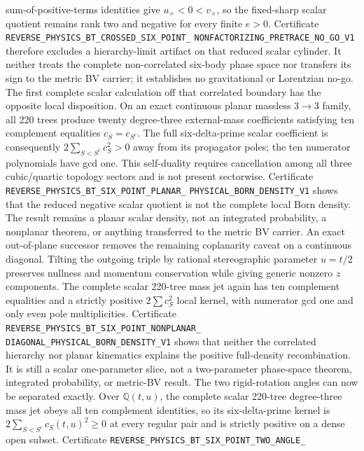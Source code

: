 \documentclass[11pt]{article}
\theoremstyle{definition}
\theoremstyle{remark}
\begin{document}
sum-of-positive-terms identities give $u_\times<0<v_\times$, so the
fixed-sharp scalar quotient remains rank two and negative for every finite
$e>0$.  Certificate
\texttt{REVERSE\_PHYSICS\_BT\_CROSSED\_SIX\_POINT\_}
\allowbreak\texttt{NONFACTORIZING\_PRETRACE\_NO\_GO\_V1}
therefore excludes a hierarchy-limit artifact on that reduced scalar
cylinder.  It neither treats the complete non-correlated six-body phase space
nor transfers its sign to the metric BV carrier; it establishes no
gravitational or Lorentzian no-go.
The first complete scalar calculation off that correlated boundary has the
opposite local disposition.  On an exact continuous planar massless
$3\to3$ family, all 220 trees produce twenty degree-three external-mass
coefficients satisfying ten complement equalities $c_S=c_{S^c}$.  The full
six-delta-prime scalar coefficient is consequently
$2\sum_{S<S^c}c_S^2>0$ away from its propagator poles; the ten numerator
polynomials have gcd one.  This self-duality requires cancellation among all
three cubic/quartic topology sectors and is not present sectorwise.
Certificate
\texttt{REVERSE\_PHYSICS\_BT\_SIX\_POINT\_PLANAR\_}
\allowbreak\texttt{PHYSICAL\_BORN\_DENSITY\_V1}
shows that the reduced negative scalar quotient is not the complete local
Born density.  The result remains a planar scalar density, not an integrated
probability, a nonplanar theorem, or anything transferred to the metric BV
carrier.
An exact out-of-plane successor removes the remaining coplanarity caveat on a
continuous diagonal.  Tilting the outgoing triple by rational stereographic
parameter $u=t/2$ preserves nullness and momentum conservation while giving
generic nonzero $z$ components.  The complete scalar 220-tree mass jet again
has ten complement equalities and a strictly positive $2\sum c_S^2$ local
kernel, with numerator gcd one and only even pole multiplicities.  Certificate
\texttt{REVERSE\_PHYSICS\_BT\_SIX\_POINT\_NONPLANAR\_}
\allowbreak\texttt{DIAGONAL\_PHYSICAL\_BORN\_DENSITY\_V1}
shows that neither the correlated hierarchy nor planar kinematics explains
the positive full-density recombination.  It is still a scalar one-parameter
slice, not a two-parameter phase-space theorem, integrated probability, or
metric-BV result.
The two rigid-rotation angles can now be separated exactly.  Over
$\mathbb Q(t,u)$, the complete scalar 220-tree degree-three mass jet obeys all
ten complement identities, so its six-delta-prime kernel is
$2\sum_{S<S^c}c_S(t,u)^2\geq0$ at every regular pair and is strictly positive
on a dense open subset.  Certificate
\texttt{REVERSE\_PHYSICS\_BT\_SIX\_POINT\_TWO\_ANGLE\_}
\end{document}
